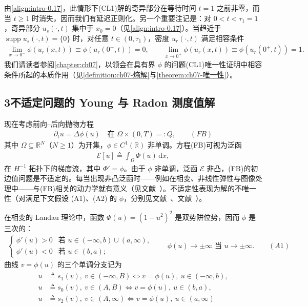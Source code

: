 \documentclass[../main.tex]{subfiles}
\begin{document}
由\eqref{align:intro-0.17}，此情形下(CL1)解的奇异部分在等待时间 $t=1$ 之前非零，而当 $t\geqslant1$ 时消失，因而我们有延迟正则化。另一个重要注记是：对 $0<t<\tau_1=1$，奇异部分 $u_s(\cdot,t)$ 集中于 $x_0=0$（见\eqref{align:intro-0.17}）。当趋近于 $\operatorname{supp}u_s(\cdot,t)=\{0\}$ 时，对任意 $t\in(0,\tau_1)$，密度 $u_r(\cdot,t)$ 满足相容条件
\begin{align}
\lim_{x\to0^-}\phi(u_r(x,t))\equiv\phi(u_r(0^-,t))=0,
\qquad
\lim_{x\to0^+}\phi(u_r(x,t))\equiv\phi(u_r(0^+,t))=1. \label{align:intro-0.18}
\end{align}
我们请读者参阅\cref{chapter:ch07}，以领会在具有界 $\phi$ 的问题(CL1)唯一性证明中相容条件所起的本质作用（见\cref{definition:ch07-熵解}与\cref{theorem:ch07-唯一性}）。

\subsection*{3\quad 不适定问题的 Young 与 Radon 测度值解}\label{subsection:intro-illposed}

现在考虑前向--后向抛物方程
\begin{align*}
\partial_t u = \Delta\phi(u) \quad \text{在 }\Omega\times(0,T)=:Q, \qquad(FB)
\end{align*}
其中 $\Omega\subseteq\mathbb{R}^N$（$N\geqslant1$）为开集，$\phi\in C^1(\mathbb{R})$ 非单调。方程(FB)可视为泛函
\begin{align}
\mathcal{E}[u] \triangleq  \int_\Omega\Phi(u)\,\mathrm{d}x, \label{align:intro-0.19}
\end{align}
在 $H^{-1}$ 拓扑下的梯度流，其中 $\Phi'=\phi$。由于 $\phi$ 非单调，泛函 $\mathcal{E}$ 非凸，(FB)的初边值问题是不适定的。每当出现非凸泛函时——例如在相变、非线性弹性与图像处理中——与(FB)相关的动力学就有意义（见文献~\cite{ref29,ref73,ref79}）。不适定性表现为解的不唯一性（对满足下文假设 (A1)、(A2) 的 $\phi$，分别见文献~\cite{ref59}、文献~\cite{ref108}）。

在相变的 Landau 理论中，函数 $\Phi(u)=(1-u^2)^2$ 是双势阱位势，因而 $\phi$ 是三次的：
\begin{align*}
\begin{cases}
\phi'(u)>0 & \text{若 }u\in(-\infty,b)\cup(a,\infty),\\
\phi'(u)<0 & \text{若 }u\in(b,a);
\end{cases}
\qquad
\phi(u)\to\pm\infty \text{ 当 }u\to\pm\infty.
\qquad(A1)
\end{align*}
曲线 $v=\phi(u)$ 的三个单调分支记为
\begin{align}
\begin{aligned}
u &\triangleq  s_1(v),\ v\in(-\infty,B) \Leftrightarrow v=\phi(u),\ u\in(-\infty,b),\\
u &\triangleq  s_0(v),\ v\in(A,B) \Leftrightarrow v=\phi(u),\ u\in(b,a),\\
u &\triangleq  s_2(v),\ v\in(A,\infty) \Leftrightarrow v=\phi(u),\ u\in(a,\infty)
\end{aligned}
\label{align:intro-0.20}
\end{align}
\end{document}
